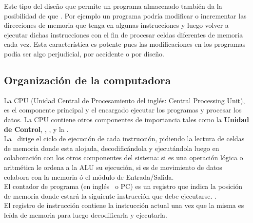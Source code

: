 Este tipo del diseño que permite un programa almacenado también da la posibilidad de que . Por ejemplo un programa podría modificar o incrementar  las direcciones de memoria que tenga en algunas instrucciones y luego volver a ejecutar dichas instrucciones con el fin de procesar celdas diferentes de memoria cada vez. Esta característica es potente  pues las modificaciones en los programas podía ser algo perjudicial, por accidente o por diseño.

\subsection{Organización de la computadora}

La CPU (Unidad Central de Procesamiento del inglés: Central Processing Unit), es el componente principal y el encargado ejecutar los programas y procesar los datos. La CPU contiene otros componentes de importancia tales como la \textbf{Unidad de Control}, , ,  y la .\\

La \UC\ dirige el ciclo de ejecución de cada instrucción, pidiendo la lectura de celdas de memoria donde esta alojada, decodificándola  y ejecutándola luego en colaboración con los otros componentes del sistema: si es una operación lógica o aritmética le ordena a la ALU su ejecución, si es de movimiento de datos colabora con la memoria ó el módulo de Entrada/Salida.\\

El contador de programa (en inglés \PC\ o PC) es un registro que indica la posición de memoria donde estará la siguiente instrucción que debe ejecutarse. .\\

El registro de instrucción contiene  la instrucción actual una vez que la misma es leída de memoria para luego decodificarla y ejecutarla.\\

